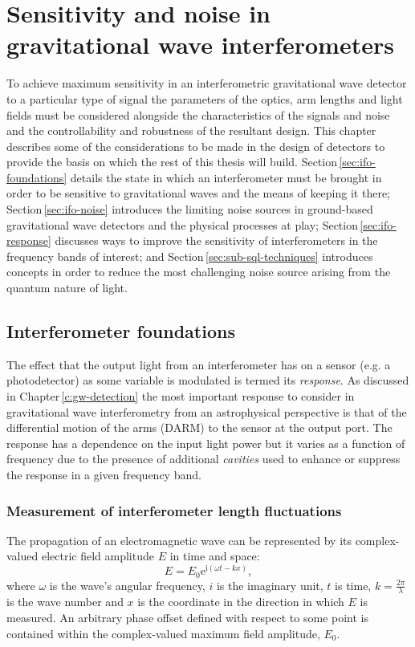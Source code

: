 \chapter{Sensitivity and noise in gravitational wave interferometers}
\label{c:instrumentation}

To achieve maximum sensitivity in an interferometric gravitational wave detector to a particular type of signal the parameters of the optics, arm lengths and light fields must be considered alongside the characteristics of the signals and noise and the controllability and robustness of the resultant design. This chapter describes some of the considerations to be made in the design of detectors to provide the basis on which the rest of this thesis will build. Section\,\ref{sec:ifo-foundations} details the state in which an interferometer must be brought in order to be sensitive to gravitational waves and the means of keeping it there; Section\,\ref{sec:ifo-noise} introduces the limiting noise sources in ground-based gravitational wave detectors and the physical processes at play; Section\,\ref{sec:ifo-response} discusses ways to improve the sensitivity of interferometers in the frequency bands of interest; and Section\,\ref{sec:sub-sql-techniques} introduces concepts in order to reduce the most challenging noise source arising from the quantum nature of light.

\section{\label{sec:ifo-foundations}Interferometer foundations}
The effect that the output light from an interferometer has on a sensor (e.g. a photodetector) as some variable is modulated is termed its \emph{response}. As discussed in Chapter\,\ref{c:gw-detection} the most important response to consider in gravitational wave interferometry from an astrophysical perspective is that of the differential motion of the arms (\gls{DARM}) to the sensor at the output port. The response has a dependence on the input light power but it varies as a function of frequency due to the presence of additional \emph{cavities} used to enhance or suppress the response in a given frequency band.

\subsection{Measurement of interferometer length fluctuations}
The propagation of an electromagnetic wave can be represented by its complex-valued electric field amplitude $E$ in time and space:
\begin{equation}
  \label{eq:em-propagation}
  E = E_0 \text{e}^{\text{i} \left( \omega t - kx \right)},
\end{equation}
where $\omega$ is the wave's angular frequency, $i$ is the imaginary unit, $t$ is time, $k = \frac{2 \pi}{\lambda}$ is the wave number and $x$ is the coordinate in the direction in which $E$ is measured. An arbitrary phase offset defined with respect to some point is contained within the complex-valued maximum field amplitude, $E_0$.

